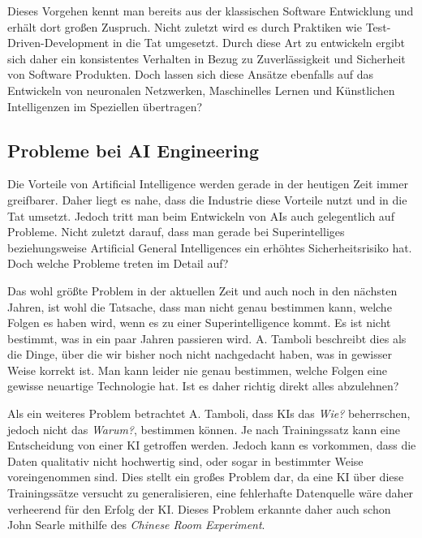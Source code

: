         Dieses Vorgehen kennt man bereits aus der klassischen Software Entwicklung und erhält dort großen Zuspruch.
        Nicht zuletzt wird es durch Praktiken wie Test-Driven-Development in die Tat umgesetzt. \cite[s. 403]{Kollanus2010}
        Durch diese Art zu entwickeln ergibt sich daher ein konsistentes Verhalten in Bezug zu Zuverlässigkeit und
        Sicherheit von Software Produkten. Doch lassen sich diese Ansätze ebenfalls auf das Entwickeln von
        neuronalen Netzwerken, Maschinelles Lernen und Künstlichen Intelligenzen im Speziellen übertragen?

        \subsection{Probleme bei AI Engineering}
        Die Vorteile von Artificial Intelligence werden gerade in der heutigen Zeit immer greifbarer. Daher liegt es
        nahe, dass die Industrie diese Vorteile nutzt und in die Tat umsetzt. Jedoch tritt man beim Entwickeln von AIs
        auch gelegentlich auf Probleme. Nicht zuletzt darauf, dass man gerade bei Superintelliges beziehungsweise
        Artificial General Intelligences ein erhöhtes Sicherheitsrisiko hat. Doch welche Probleme treten im Detail auf?

        Das wohl größte Problem in der aktuellen Zeit und auch noch in den nächsten Jahren, ist wohl die Tatsache, dass
        man nicht genau bestimmen kann, welche Folgen es haben wird, wenn es zu einer Superintelligence kommt.
        \cite[s. 21]{Tamboli2019} Es ist nicht bestimmt, was in ein paar Jahren passieren wird. A. Tamboli beschreibt
        dies als die Dinge, über die wir bisher noch nicht nachgedacht haben, was in gewisser Weise korrekt ist.
        Man kann leider nie genau bestimmen, welche Folgen eine gewisse neuartige Technologie hat. Ist es daher richtig
        direkt alles abzulehnen?

        Als ein weiteres Problem betrachtet A. Tamboli, dass KIs das \textit{Wie?} beherrschen, jedoch nicht das
        \textit{Warum?}, bestimmen können.\cite[s. 24]{Tamboli2019} Je nach Trainingssatz kann eine Entscheidung von
        einer KI getroffen werden. Jedoch kann es vorkommen, dass die Daten qualitativ nicht hochwertig sind, oder sogar
        in bestimmter Weise voreingenommen sind. Dies stellt ein großes Problem dar, da eine KI über diese Trainingssätze
        versucht zu generalisieren, eine fehlerhafte Datenquelle wäre daher verheerend für den Erfolg der KI. Dieses
        Problem erkannte daher auch schon John Searle mithilfe des \textit{Chinese Room Experiment}.\cite{cole_2014}

